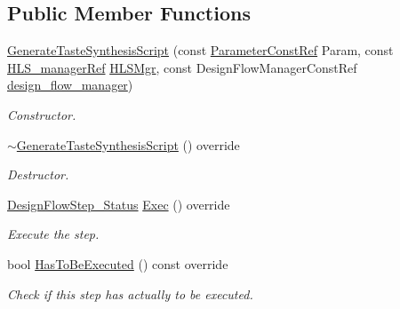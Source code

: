 \subsection*{Public Member Functions}
\begin{DoxyCompactItemize}
\item 
\hyperlink{classGenerateTasteSynthesisScript_a83f8f31d125253e6a8298a03ee2863ed}{Generate\+Taste\+Synthesis\+Script} (const \hyperlink{Parameter_8hpp_a37841774a6fcb479b597fdf8955eb4ea}{Parameter\+Const\+Ref} Param, const \hyperlink{hls__manager_8hpp_acd3842b8589fe52c08fc0b2fcc813bfe}{H\+L\+S\+\_\+manager\+Ref} \hyperlink{classHLS__step_ade85003a99d34134418451ddc46a18e9}{H\+L\+S\+Mgr}, const Design\+Flow\+Manager\+Const\+Ref \hyperlink{classDesignFlowStep_ab770677ddf087613add30024e16a5554}{design\+\_\+flow\+\_\+manager})
\begin{DoxyCompactList}\small\item\em Constructor. \end{DoxyCompactList}\item 
\hyperlink{classGenerateTasteSynthesisScript_a3eef3d4e0e73974ea2bd47ebd59fe08a}{$\sim$\+Generate\+Taste\+Synthesis\+Script} () override
\begin{DoxyCompactList}\small\item\em Destructor. \end{DoxyCompactList}\item 
\hyperlink{design__flow__step_8hpp_afb1f0d73069c26076b8d31dbc8ebecdf}{Design\+Flow\+Step\+\_\+\+Status} \hyperlink{classGenerateTasteSynthesisScript_a1b01b440d4a3ea2e23b9753c83d7cf7d}{Exec} () override
\begin{DoxyCompactList}\small\item\em Execute the step. \end{DoxyCompactList}\item 
bool \hyperlink{classGenerateTasteSynthesisScript_acbd9a6934e6ba26615b49dc66650981f}{Has\+To\+Be\+Executed} () const override
\begin{DoxyCompactList}\small\item\em Check if this step has actually to be executed. \end{DoxyCompactList}\end{DoxyCompactItemize}
